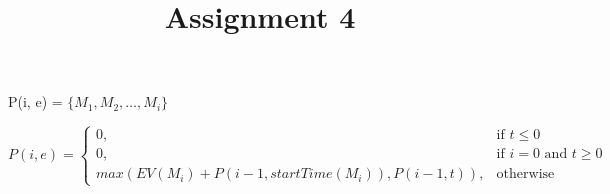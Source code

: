 \documentclass{article}
\begin{document}
	\title{Assignment 4}
	
	P(i, e) = 
	$\lbrace M_1, M_2, \dots, M_i \rbrace$ 
	
	\[
	P(i, e) =
	\begin{cases}
		0, & \text{if } t \leq 0 \\
		0, & \text{if } i = 0 \text{ and } t \geq 0 \\
		max(EV(M_i) + P(i-1, startTime(M_i)), P(i-1,t)), & \text{otherwise}
	\end{cases}
	\]
\end{document}
